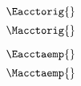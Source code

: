 

\begin{landscape}

\linespread{1}


\sectionsep{}

{
\begin{equation} \label{eq:E_acct_orig}
  \Eacctorig{}
\end{equation}
}
{
\begin{equation} \label{eq:M_acct_orig}
  \Macctorig{}
\end{equation}
}

\sectionsep{}

{
\begin{equation} \label{eq:E_acct_aemp}
  \Eacctaemp{}
\end{equation}
}
{
\begin{equation} \label{eq:M_acct_aemp}
  \Macctaemp{}
\end{equation}
}

\sectionsep{}

\derivsection{}
{
~
  
}
\end{landscape}
